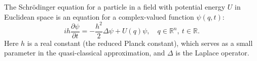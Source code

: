 The Schrödinger equation for a particle in a field with potential energy $U$ in Euclidean space is an equation for a complex-valued function $\psi(q, t)$:
$$ih \frac{\partial \psi}{\partial t} = -\frac{h^{2}}{2} \Delta \psi + U(q)\psi, \quad q \in \mathbb{R}^{n}, \ t \in \mathbb{R}.$$
Here $h$ is a real constant (the reduced Planck constant), which serves as a small parameter in the quasi-classical approximation, and $\Delta$ is the Laplace operator.
